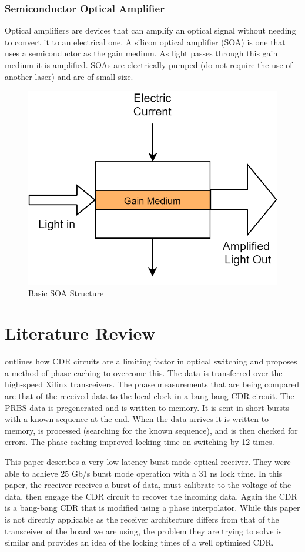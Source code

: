 \subsubsection{Semiconductor Optical Amplifier}%
\label{ssub:semiconductor_optical_amplifier}
Optical amplifiers are devices that can amplify an optical signal without
needing to convert it to an electrical one. 
A silicon optical amplifier (SOA) is one that uses a semiconductor as the gain
medium. As light passes through this gain medium it is amplified.
SOAs are electrically pumped (do not require the use of another laser) and are of
small size.
\begin{figure}[ht]
    \centering
    \includegraphics[width=0.4\linewidth]{img/soa.png}
    \caption{Basic SOA Structure}%
    \label{fig:soa}
\end{figure}



\section{Literature Review}%
\label{sec:literature_review}

\noindent \cite{kari_phase} outlines how CDR circuits are a limiting factor in
optical switching and proposes a method of phase caching to overcome this.  The
data is transferred over the high-speed Xilinx transceivers.  The phase
measurements that are being compared are that of the received data to the local
clock in a bang-bang CDR circuit.  The PRBS data is pregenerated and is written
to memory. It is sent in short bursts with a known sequence at the end. When
the data arrives it is written to memory, is processed (searching for the known
sequence), and is then checked for errors.  The phase caching
improved locking time on switching by 12 times.


\noindent \cite{rylyakov201525}  This paper describes a very low latency burst
mode optical receiver. They were able to achieve 25 Gb/s burst mode operation
with a 31 ns lock time. In this paper, the receiver receives a burst of data,
must calibrate to the voltage of the data, then engage the CDR circuit to
recover the incoming data.  Again the CDR is a bang-bang CDR that is modified
using a phase interpolator.  While this paper is not directly applicable as the
receiver architecture differs from that of the transceiver of the board we are
using, the problem they are trying to solve is similar and provides an idea of
the locking times of a well optimised CDR.

